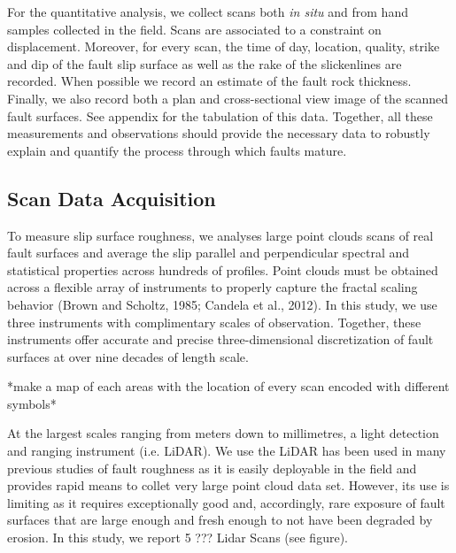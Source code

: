 \documentclass[12pt,a4paper]{article}
\begin{document}
For the quantitative analysis, we collect scans both \textit{in situ} and from hand samples collected in the field. Scans are associated to a constraint on displacement. Moreover, for every scan, the time of day, location, quality, strike and dip of the fault slip surface as well as the rake of the slickenlines are recorded. When possible we record an estimate of the fault rock thickness. Finally, we also record both a plan and cross-sectional view image of the scanned fault surfaces.  See appendix for the tabulation of this data. Together, all these measurements and observations should provide the necessary data to robustly explain and quantify the process through which faults mature.

	\subsection{Scan Data Acquisition}

To measure slip surface roughness, we analyses large point clouds scans of real fault surfaces and average the slip parallel and perpendicular spectral and statistical properties across hundreds of profiles. Point clouds must be obtained across a flexible array of instruments to properly capture the fractal scaling behavior (Brown and Scholtz, 1985; Candela et al., 2012). In this study, we use three instruments with complimentary scales of observation.  Together, these instruments offer accurate and precise three-dimensional discretization of fault surfaces at over nine decades of length scale.

*make a map of each areas with the location of every scan encoded with different symbols*

At the largest scales ranging from meters down to millimetres, a light detection and ranging instrument (i.e. LiDAR). We use the  LiDAR has been used in many previous studies of fault roughness as it is easily deployable in the field and provides rapid means to collet very large point cloud data set. However, its use is limiting as it requires exceptionally good and, accordingly, rare exposure of fault surfaces that are large enough and fresh enough to not have been degraded by erosion. In this study, we report 5 ??? Lidar Scans (see figure).
\end{document}
